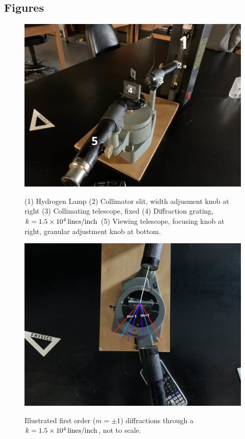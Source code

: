 \documentclass[10pt, twocolumn]{article}
\theoremstyle{definition}
\begin{document}
\subsection{Figures}
\begin{figure}[h]
  \centering%
  \caption{(1) Hydrogen Lamp (2) Collimator slit, width adjusment knob at right (3) Collimating telescope, fixed
    (4) Diffraction grating, $k=\qty{1.5d4}{lines\per inch}$ (5) Viewing telescope, focusing knob at right, granular adjustment knob at bottom.}
  \includegraphics[scale=0.1]{Apparatus.jpg}
  \label{app}
\end{figure}

\begin{figure}[h]
  \centering%
  \caption{Illustrated first order ($m=\pm1$) diffractions through a $k=\qty{1.5d4}{lines\per inch}$, not to scale.}
  \includegraphics[scale=0.1]{Grating Above.jpg}
  \label{grat}
\end{figure}
\end{document}

